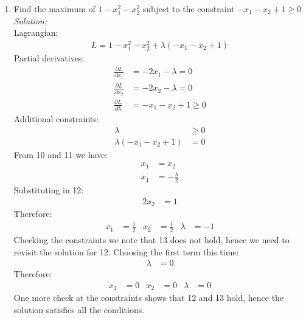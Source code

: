 \documentclass[12pt,a4paper]{article}
\begin{document}
\begin{enumerate}
\item Find the maximum of $1-x_1^2 -x_2^2$ subject to the constraint $-x_1-x_2+1\geqslant 0$ \\
	\emph{Solution:} \\
		Lagrangian:
			\begin{align*}
			L = 1 - x_1^2 - x_2^2 + \lambda (-x_1 - x_2 + 1)
			\end{align*}
		Partial derivatives:
			\begin{align}
			\frac{\partial L}{\partial x_1} &= -2x_1 - \lambda = 0 \\
			\frac{\partial L}{\partial x_2} &= -2x_2 - \lambda = 0 \\
			\frac{\partial L}{\partial \lambda} &= -x_1 - x_2 + 1 \geqslant 0
			\end{align}
		Additional constraints:
			\begin{align}
			\lambda &\geqslant 0 \\
			\lambda (-x_1 - x_2 + 1) &= 0
			\end{align}
		From 10 and 11 we have: 
			\begin{align*}
			x_1 &= x_2 \\
			x_1 &= - \frac{\lambda}{2}
			\end{align*}
		Substituting in 12:
			\begin{align*}
			2x_2 &= 1
			\end{align*}
		Therefore:
			\begin{align*}
			x_1 &= \frac{1}{2} &
			x_2 &= \frac{1}{2} &
			\lambda &=  -1
			\end{align*}
		Checking the constraints we note that 13 does not hold, hence we need to revisit the solution for 12. Choosing the first term this time: 
			\begin{align*}
			\lambda &= 0
			\end{align*}
		Therefore:
			\begin{align*}
			x_1 &= 0 &
			x_2 &= 0 &
			\lambda &=  0
			\end{align*}
		One more check at the constraints shows that 12 and 13 hold, hence the solution satisfies all the conditions.



\end{enumerate}
\end{document}
